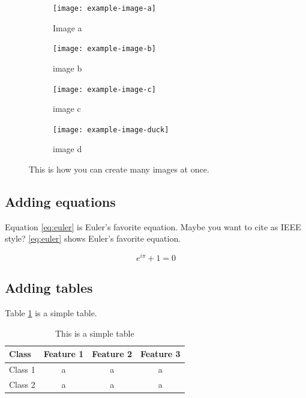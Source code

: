\begin{figure}[ht] 
  \begin{subfigure}[b]{0.5\linewidth}
    \centering
    \texttt{[image: example-image-a]}
    \caption{Image a} 
    \label{fig:a} 
    \vspace{4ex}
  \end{subfigure}%
  \begin{subfigure}[b]{0.5\linewidth}
    \centering
    \texttt{[image: example-image-b]} 
    \caption{image b} 
    \label{fig:b} 
    \vspace{4ex}
  \end{subfigure} 
  \begin{subfigure}[b]{0.5\linewidth}
    \centering
    \texttt{[image: example-image-c]} 
    \caption{image c} 
    \label{fig:c} 
  \end{subfigure}%
  \begin{subfigure}[b]{0.5\linewidth}
    \centering
    \texttt{[image: example-image-duck]}
    \caption{image d} 
    \label{fig:d} 
  \end{subfigure} 
  \caption{This is how you can create many images at once.}
  \label{fig:example_many_images} 
\end{figure}

\subsection{Adding equations}

Equation \ref{eq:euler} is Euler's favorite equation. Maybe you want to cite as IEEE style? \eqref{eq:euler} shows Euler's favorite equation.

\begin{equation}
\label{eq:euler}
    e^{i\pi} + 1 = 0
\end{equation}

\subsection{Adding tables}

Table \ref{tab:table1} is a simple table.
\begin{table}[H]
  \caption{This is a simple table}
  \label{tab:table1}
  \centering
  \begin{tabular}{lccc}
  \toprule
    Class       &   Feature 1   &   Feature 2   &   Feature 3   \\
    \midrule
    Class 1     &   a   &   a   &   a   \\
    Class 2     &   a   &   a   &   a   \\
    \bottomrule
  \end{tabular}
\end{table}


